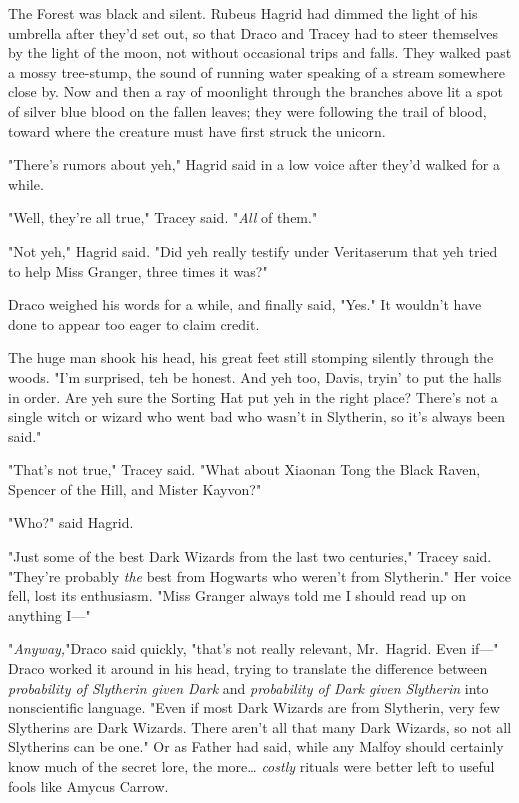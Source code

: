 The Forest was black and silent. Rubeus Hagrid had dimmed the light of his
umbrella after they'd set out, so that Draco and Tracey had to steer themselves
by the light of the moon, not without occasional trips and falls. They walked
past a mossy tree-stump, the sound of running water speaking of a stream
somewhere close by. Now and then a ray of moonlight through the branches above
lit a spot of silver blue blood on the fallen leaves; they were following the
trail of blood, toward where the creature must have first struck the unicorn.

"There's rumors about yeh," Hagrid said in a low voice after they'd walked for
a while.

"Well, they're all true," Tracey said. "\emph{All} of them."

"Not yeh," Hagrid said. "Did yeh really testify under Veritaserum that yeh
tried to help Miss Granger, three times it was?"

Draco weighed his words for a while, and finally said, "Yes." It wouldn't have
done to appear too eager to claim credit.

The huge man shook his head, his great feet still stomping silently through the
woods. "I'm surprised, teh be honest. And yeh too, Davis, tryin' to put the
halls in order. Are yeh sure the Sorting Hat put yeh in the right place?
There's not a single witch or wizard who went bad who wasn't in Slytherin, so
it's always been said."

"That's not true," Tracey said. "What about Xiaonan Tong the Black Raven,
Spencer of the Hill, and Mister Kayvon?"

"Who?" said Hagrid.

"Just some of the best Dark Wizards from the last two centuries," Tracey said.
"They're probably \emph{the} best from Hogwarts who weren't from Slytherin."
Her voice fell, lost its enthusiasm. "Miss Granger always told me I should read
up on anything I---"

"\emph{Anyway,}"Draco said quickly, "that's not really relevant, Mr.~Hagrid.
Even if---" Draco worked it around in his head, trying to translate the
difference between \emph{probability of Slytherin given Dark} and
\emph{probability of Dark given Slytherin} into nonscientific language. "Even
if most Dark Wizards are from Slytherin, very few Slytherins are Dark Wizards.
There aren't all that many Dark Wizards, so not all Slytherins can be one." Or
as Father had said, while any Malfoy should certainly know much of the secret
lore, the more{\ldots} \emph{costly} rituals were better left to useful fools
like Amycus Carrow.

